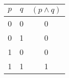 \begin{tabular}{|c|c||c|}
\hline
$ p $ & $ q $ & $ (p \wedge q) $ \\
\hline
0 & 0 & 0 \\
0 & 1 & 0 \\
1 & 0 & 0 \\
1 & 1 & 1 \\
\hline
\end{tabular}
\label{table:tt1}
